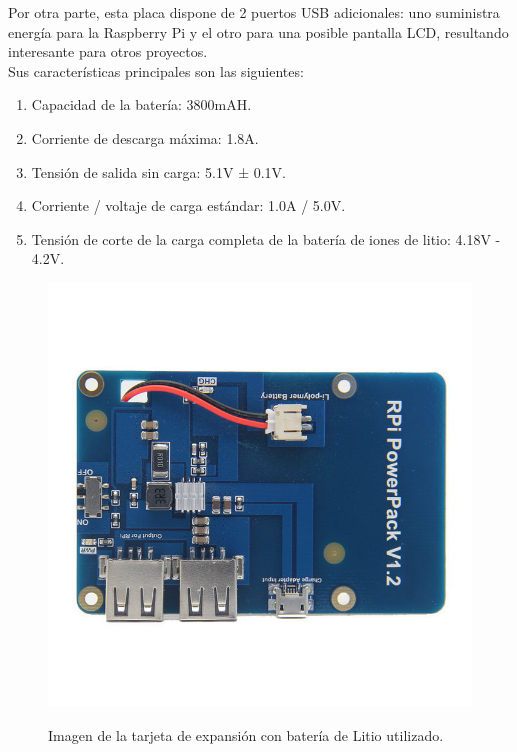 Por otra parte, esta placa dispone de 2 puertos USB adicionales: uno suministra energía para la Raspberry Pi y el otro para una posible pantalla LCD, resultando interesante para otros proyectos.\\

Sus características principales son las siguientes:

\begin{enumerate}
 \item Capacidad de la batería: 3800mAH.
 \item Corriente de descarga máxima: 1.8A.
 \item Tensión de salida sin carga: 5.1V ± 0.1V.
 \item Corriente / voltaje de carga estándar: 1.0A / 5.0V.
 \item Tensión de corte de la carga completa de la batería de iones de litio: 4.18V - 4.2V.
\end{enumerate}


\begin{figure}[H]
  \begin{center}
    \includegraphics[scale=0.3]{imagenes/robot/modulo-alimentacion.jpg}\\
    \caption{Imagen de la tarjeta de expansión con batería de Litio utilizado.}
  \end{center}
\end{figure}

